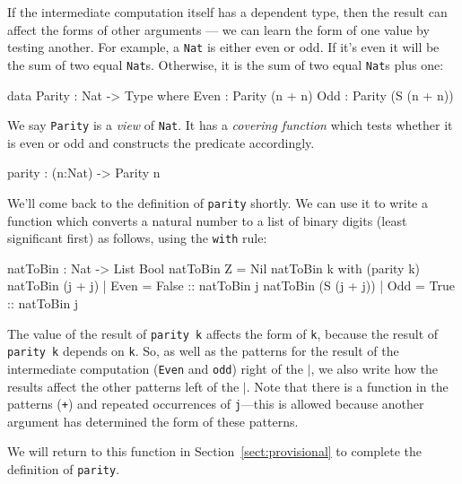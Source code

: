 If the intermediate computation itself has a dependent type, then the result can affect the forms of other arguments --- we can learn the form of one value by testing another.
For example, a \texttt{Nat} is either even or odd.
If it's even it will be the sum of two equal \texttt{Nat}s.
Otherwise, it is the sum of two equal \texttt{Nat}s  plus one:

\begin{code}
data Parity : Nat -> Type where
   Even : Parity (n + n)
   Odd  : Parity (S (n + n))
\end{code}

\noindent
We say \texttt{Parity} is a \emph{view} of \texttt{Nat}. 
It has a \emph{covering function} which tests whether it is even or odd and constructs the predicate accordingly.

\begin{code}
parity : (n:Nat) -> Parity n
\end{code}

\label{sect:nattobin}

\noindent
We'll come back to the definition of \texttt{parity} shortly.
We can use it to write a function which converts a natural number to a list of binary digits (least significant first) as follows, using the \texttt{with} rule:

\begin{code}
natToBin : Nat -> List Bool
natToBin Z = Nil
natToBin k with (parity k)
   natToBin (j + j)     | Even = False :: natToBin j
   natToBin (S (j + j)) | Odd  = True  :: natToBin j
\end{code}

\noindent
The value of the result of \texttt{parity k} affects the form of \texttt{k}, because the result of \texttt{parity k} depends on \texttt{k}. 
So, as well as the patterns for the result of the intermediate computation (\texttt{Even} and \texttt{odd}) right of the  \texttt{$\mid$}, we also write how the results affect the other patterns left of the $\mid$.
Note that there is a function in the patterns (\texttt{+}) and repeated occurrences of \texttt{j}---this is allowed because another argument has determined the form of these patterns.

We will return to this function in Section~\ref{sect:provisional} to complete the definition of \texttt{parity}.


